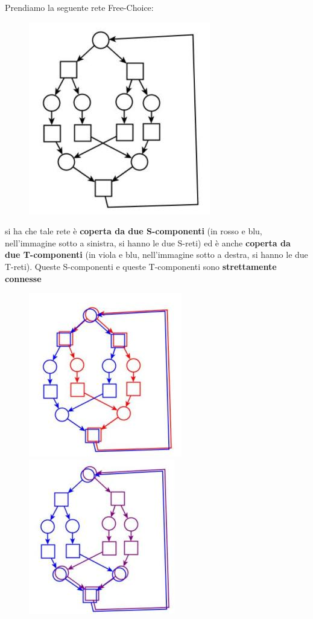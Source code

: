 \documentclass[a4paper,12pt, oneside]{book}
\begin{document}
\begin{esempio}
  Prendiamo la seguente rete Free-Choice:
  \begin{figure}[H]
    \centering
    \includegraphics[scale = 0.5]{img/fc9.jpg} 
  \end{figure}
  si ha che tale rete è \textbf{coperta da due S-componenti} (in rosso e blu,
  nell'immagine sotto a sinistra, si hanno le due S-reti) ed è anche
  \textbf{coperta da due T-componenti} (in viola e blu, nell'immagine sotto a
  destra, si hanno le due T-reti). Queste S-componenti e queste T-componenti
  sono \textbf{strettamente connesse}
  \begin{figure}[H]
    \centering
    \includegraphics[scale = 0.5]{img/fc10.jpg}
    \includegraphics[scale = 0.5]{img/fc11.jpg} 
  \end{figure}
\end{esempio}
\end{document}
